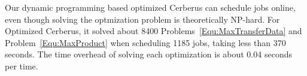 
Our dynamic programming based optimized Cerberus can schedule jobs online,
even though solving the optmization problem is theoretically NP-hard.
For Optimized Cerberus, it solved about 8400 Problems~\ref{Equ:MaxTransferData} and
Problem~\ref{Equ:MaxProduct} when scheduling 1185 jobs,
taking less than 370 seconds.
The time overhead of solving each optimization is about 0.04 seconds per time.




